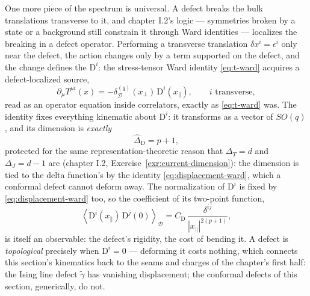 One more piece of the spectrum is universal. A defect breaks the bulk
translations transverse to it, and chapter I.2's logic --- symmetries
broken by a state or a background still constrain it through Ward
identities --- localizes the breaking in a defect operator. Performing
a transverse translation $\delta x^i = \epsilon^i$ only near the
defect, the action changes only by a term supported on the defect, and
the change defines the  $\mathrm{D}^i$:
the stress-tensor Ward identity \eqref{eq:t-ward} acquires a
defect-localized source,
\begin{equation}
\partial_\mu T^{\mu i}(x) = - \delta^{(q)}_{\mathcal D}(x_\perp)\,
\mathrm{D}^i(x_\parallel),
\qquad i \text{ transverse},
\label{eq:displacement-ward}
\end{equation}
read as an operator equation inside correlators, exactly as
\eqref{eq:t-ward} was. The identity fixes everything kinematic about
$\mathrm{D}^i$: it transforms as a vector of $SO(q)$, and its dimension
is \emph{exactly}
\begin{equation}
\hat\Delta_{\mathrm{D}} = p + 1,
\label{eq:displacement-dimension}
\end{equation}
protected for the same representation-theoretic reason that
$\Delta_T = d$ and $\Delta_J = d - 1$ are (chapter I.2,
Exercise~\ref{exr:current-dimension}): the dimension is tied to the
delta function's by the identity \eqref{eq:displacement-ward}, which a
conformal defect cannot deform away. The normalization of
$\mathrm{D}^i$ is fixed by \eqref{eq:displacement-ward} too, so the
coefficient of its two-point function,
\begin{equation}
\left\langle \mathrm{D}^i(x_\parallel)\, \mathrm{D}^j(0)
\right\rangle_{\mathcal D}
= C_{\mathrm{D}}\, \frac{\delta^{ij}}{|x_\parallel|^{2(p+1)}},
\label{eq:cd-def}
\end{equation}
is itself an observable: the defect's rigidity, the cost of
bending it. A defect is \emph{topological} precisely when
$\mathrm{D}^i = 0$ --- deforming it costs nothing, which connects this
section's kinematics back to the seams and charges of the chapter's
first half: the Ising line defect $\tilde\gamma$ has vanishing
displacement; the conformal defects of this section, generically, do
not.

